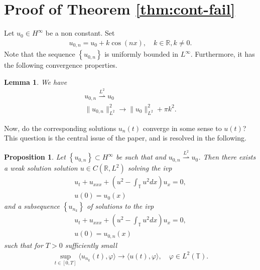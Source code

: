 \documentclass[12pt,reqno]{amsart}
\numberwithin{equation}{section}  %
\newcommand{\rr}{\mathbb{R}}
\newcommand{\ci}{\mathbb{T}}
\newcommand{\vp}{\varphi}
\newtheorem{lemma}[theorem]{Lemma}
\newtheorem{proposition}[theorem]{Proposition}
\begin{document}
%
%
%
%
%
%
%
%
\section{Proof of Theorem \ref{thm:cont-fail}}
\label{sec:pf-thm}
Let $u_{0} \in H^{\infty}$ be a non constant. Set
%
%
\begin{equation}
  \label{ill-pos-init-data}
\begin{split}
  u_{0,n} = u_{0} + k \cos(nx), \quad k\in \rr, k \neq 0.
\end{split}
\end{equation}
%
Note that the sequence $\left\{ u_{0,n} \right\}$ is uniformly bounded in $L^{\infty}$.
Furthermore, it has the following convergence properties.
%
%
%
%
%
%
%                
%
%
%
%
\begin{lemma}
We have
%
%
\begin{gather}
  u_{0,n}\overset{L^{2}}{\rightharpoonup} u_{0}
  \\
  \| u_{0,n} \|_{L^{2}}^{2} \to \| u_{0} \|_{L^{2}}^{2} + \pi k^{2}.
\end{gather}
\label{lem:conv-prop-init}
\end{lemma}
%
%
%
%
Now, do the corresponding solutions $u_{n}(t)$ converge in some sense to
$u(t)$? This question is
the central issue of the paper, and is resolved in the following.
%
%
%
%
%
%
%
%
\begin{proposition}
  Let $\left\{ u_{0,n} \right\} \subset
  H^{\infty}$ be such that and $u_{0,n} \overset{L^{2}}{\rightharpoonup} u_{0}$.
  Then there exists a weak solution solution $u \in C(\rr,
  L^{2})$ solving the ivp
  \begin{gather}
    \label{n-mkdv}
    u_{t} + u_{xxx} + \left( u^{2} - \int_{\ci} u^{2} dx \right)u_{x} = 0,
    \\
    u(0) = u_{0}(x)
    \label{n-mkdv-init}
  \end{gather}
  and a subsequence $\left\{ u_{n_{k}} \right\}$ of solutions to the ivp
  \begin{gather}
    u_{t} + u_{xxx} + \left( u^{2} - \int_{\ci} u^{2} dx \right)u_{x} = 0,
    \\
    u(0) = u_{0,n}(x)
  \end{gather}
%
%
  such that for $T > 0$ sufficiently small
  \begin{equation*}
  \begin{split}
    \sup_{t \in [0, T]} \langle u_{n_{k}}(t), \vp \rangle \to \langle
    u(t), \vp
    \rangle, \quad \vp \in L^{2}(\ci).
  \end{split}
  \end{equation*}
\label{prop:key-paper}
\end{proposition}
\end{document}
